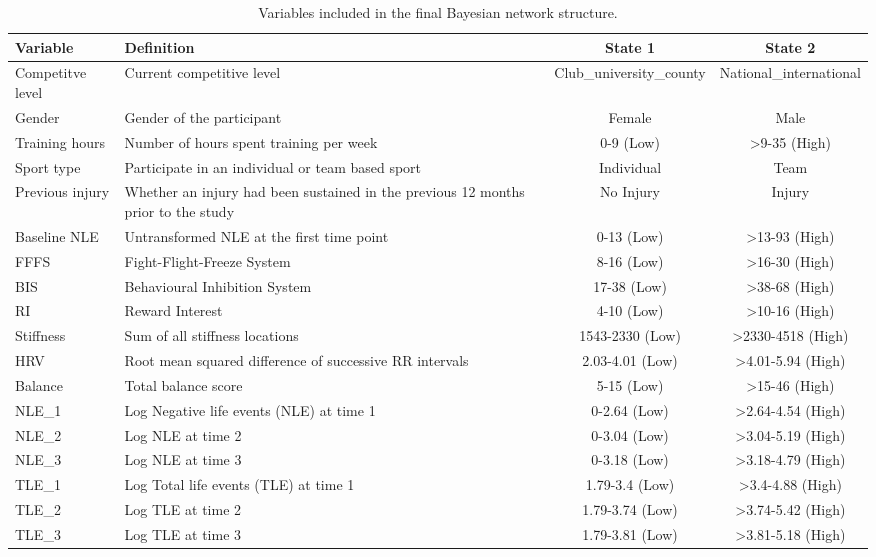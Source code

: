 \documentclass[
  english,
  man]{apa6}
\begin{document}
\begin{table}[H]

\caption{\label{tab:table2}Variables included in the final Bayesian network structure.}
\centering
\fontsize{11}{13}\selectfont
\begin{tabular}[t]{l|>{\raggedright\arraybackslash}p{5.2cm}|c|c}
\hline
Variable & Definition & State 1 & State 2\\
\hline
Competitve level & Current competitive level & Club\_university\_county & National\_international\\
\hline
Gender & Gender of the participant & Female & Male\\
\hline
Training hours & Number of hours spent training per week & 0-9 (Low) & >9-35 (High)\\
\hline
Sport type & Participate in an individual or team based sport & Individual & Team\\
\hline
Previous injury & Whether an injury had been sustained in the previous 12 months prior to the study & No Injury & Injury\\
\hline
Baseline NLE & Untransformed NLE at the first time point & 0-13 (Low) & >13-93 (High)\\
\hline
FFFS & Fight-Flight-Freeze System & 8-16 (Low) & >16-30 (High)\\
\hline
BIS & Behavioural Inhibition System & 17-38 (Low) & >38-68 (High)\\
\hline
RI & Reward Interest & 4-10 (Low) & >10-16 (High)\\
\hline
Stiffness & Sum of all stiffness locations & 1543-2330 (Low) & >2330-4518 (High)\\
\hline
HRV & Root mean squared difference of successive RR intervals & 2.03-4.01 (Low) & >4.01-5.94 (High)\\
\hline
Balance & Total balance score & 5-15 (Low) & >15-46 (High)\\
\hline
NLE\_1 & Log Negative life events (NLE) at time 1 & 0-2.64 (Low) & >2.64-4.54 (High)\\
\hline
NLE\_2 & Log NLE at time 2 & 0-3.04 (Low) & >3.04-5.19 (High)\\
\hline
NLE\_3 & Log NLE at time 3 & 0-3.18 (Low) & >3.18-4.79 (High)\\
\hline
TLE\_1 & Log Total life events (TLE) at time 1 & 1.79-3.4 (Low) & >3.4-4.88 (High)\\
\hline
TLE\_2 & Log TLE at time 2 & 1.79-3.74 (Low) & >3.74-5.42 (High)\\
\hline
TLE\_3 & Log TLE at time 3 & 1.79-3.81 (Low) & >3.81-5.18 (High)\\
\hline
\end{tabular}
\end{table}
\end{document}

